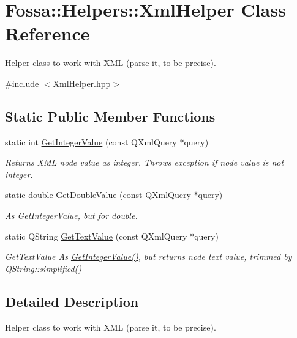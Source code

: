\hypertarget{class_fossa_1_1_helpers_1_1_xml_helper}{}\section{Fossa\+:\+:Helpers\+:\+:Xml\+Helper Class Reference}
\label{class_fossa_1_1_helpers_1_1_xml_helper}


Helper class to work with X\+ML (parse it, to be precise).  




{\ttfamily \#include $<$Xml\+Helper.\+hpp$>$}

\subsection*{Static Public Member Functions}
\begin{DoxyCompactItemize}
\item 
static int \hyperlink{class_fossa_1_1_helpers_1_1_xml_helper_a7bc8a5dd4d5ab503f274c3bb9a559f84}{Get\+Integer\+Value} (const Q\+Xml\+Query $\ast$query)
\begin{DoxyCompactList}\small\item\em Returns X\+ML node value as integer. Throws exception if node value is not integer. \end{DoxyCompactList}\item 
static double \hyperlink{class_fossa_1_1_helpers_1_1_xml_helper_aa079061f79b80c958c5f21c3e0b02252}{Get\+Double\+Value} (const Q\+Xml\+Query $\ast$query)
\begin{DoxyCompactList}\small\item\em As Get\+Integer\+Value, but for double. \end{DoxyCompactList}\item 
static Q\+String \hyperlink{class_fossa_1_1_helpers_1_1_xml_helper_a2e63bbe1bd57f655ee865171b7a24c4a}{Get\+Text\+Value} (const Q\+Xml\+Query $\ast$query)
\begin{DoxyCompactList}\small\item\em Get\+Text\+Value As \hyperlink{class_fossa_1_1_helpers_1_1_xml_helper_a7bc8a5dd4d5ab503f274c3bb9a559f84}{Get\+Integer\+Value()}, but returns node text value, trimmed by Q\+String\+::simplified() \end{DoxyCompactList}\end{DoxyCompactItemize}


\subsection{Detailed Description}
Helper class to work with X\+ML (parse it, to be precise). 

